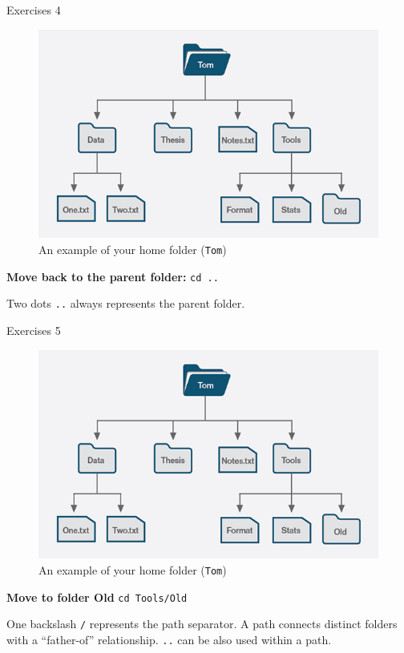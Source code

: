 \documentclass{beamer}
\begin{document}
\begin{frame}{Exercises 4}
	\begin{figure}
		\centering
		\includegraphics[width=0.7\linewidth]{00shell}
		\caption{An example of your home folder (\texttt{Tom})}
		\label{fig:00shell}
	\end{figure}
	\textbf{Move back to the parent folder:} \pause \texttt{cd ..}
	
	Two dots \texttt{..} always represents the parent folder.
\end{frame}

\begin{frame}{Exercises 5}
	\begin{figure}
		\centering
		\includegraphics[width=0.7\linewidth]{00shell}
		\caption{An example of your home folder (\texttt{Tom})}
		\label{fig:00shell}
	\end{figure}
	\textbf{Move to folder Old} \pause \texttt{cd Tools/Old}
	
	One backslash \texttt{/} represents the path separator. A path connects distinct folders with a ``father-of'' relationship.
	\texttt{..} can be also used within a path.
\end{frame}
\end{document}
